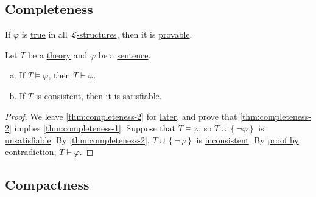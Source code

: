 \subsection{Completeness}
If \(\varphi \) is \hyperref[def:truth]{true} in all \hyperref[def:structure]{\(\mathcal{L} \)-structures}, then it is \hyperref[def:proof]{provable}.

\begin{theorem}[Completeness]\label{thm:completeness}
	Let \(T\) be a \hyperref[def:theory]{theory} and \(\varphi \) be a \hyperref[def:sentence]{sentence}.
	\begin{enumerate}[(a)]
		\item\label{thm:completeness-1} If \(T \models \varphi \), then \(T \vdash \varphi \).
		\item\label{thm:completeness-2} If \(T\) is \hyperref[def:consistent]{consistent}, then it is \hyperref[def:satisfiable]{satisfiable}.
	\end{enumerate}
\end{theorem}
\begin{proof}
	We leave \autoref{thm:completeness-2} for \hyperref[pf:thm:completeness-2]{later}, and prove that \autoref{thm:completeness-2} implies \autoref{thm:completeness-1}. Suppose that \(T \models \varphi \), so \(T \cup \left\{ \lnot \varphi  \right\} \) is \hyperref[def:satisfiable]{unsatisfiable}. By \autoref{thm:completeness-2}, \(T \cup \left\{ \lnot \varphi  \right\} \) is \hyperref[def:inconsistent]{inconsistent}. By \hyperref[prop:proof-by-contradiction]{proof by contradiction}, \(T \vdash \varphi \).
\end{proof}

\subsection{Compactness}

